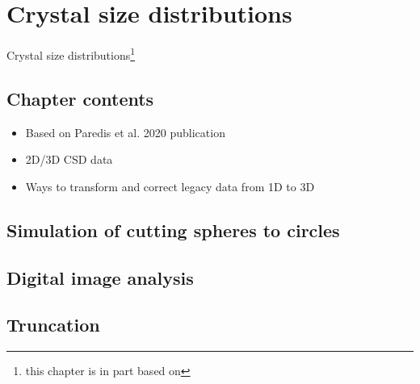 \chapter{Crystal size distributions}{Crystal size distributions\footnote{this chapter is in part based on }}\label{ch:csd}

\section{Chapter contents}
\begin{itemize}
    \item Based on Paredis et al. 2020 publication
    \item 2D/3D CSD data
    \item Ways to transform and correct legacy data from 1D to 3D
\end{itemize}

\section{Simulation of cutting spheres to circles}
\section{Digital image analysis}
\section{Truncation}




\cleardoublepage

